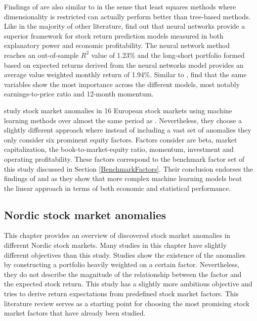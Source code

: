 \documentclass[12pt]{article}
\begin{document}

Findings of \citet{Drobetz} are also similar to \citet{TOBEK2021100588} in the sense that least squares methods where dimensionality is restricted can actually perform better than tree-based methods. Like in the majority of other literature, \citeauthor{Drobetz} find out that neural networks provide a superior framework for stock return prediction models measured in both explanatory power and economic profitability. The neural network method reaches an out-of-sample $R^{2}$ value of 1.23\% and the long-short portfolio formed based on expected returns derived from the neural networks model provides an average value weighted monthly return of 1.94\%. Similar to \citet{guetal}, \citeauthor{Drobetz} find that the same variables show the most importance across the different models, most notably earnings-to-price ratio and 12-month momentum. \par

\citet*{Fieberg} study stock market anomalies in 16 European stock markets using machine learning methods over almost the same period as \citet{Drobetz}\footnotemark. Nevertheless, they choose a slightly different approach where instead of including a vast set of anomalies they only consider six prominent equity factors. Factors \citeauthor{Fieberg} consider are beta, market capitalization, the book-to-market-equity ratio, momentum, investment and operating profitability. These factors correspond to the benchmark factor set of this study discussed in Section \ref{BenchmarkFactors}. Their conclusion endorses the findings of \citet{Drobetz} and \citet{TOBEK2021100588} as they show that more complex machine learning models beat the linear approach in terms of both economic and statistical performance. \par


\subsection{Nordic stock market anomalies}\label{NordicStockMarketAnomalies}

This chapter provides an overview of discovered stock market anomalies in different Nordic stock markets. Many studies in this chapter have slightly different objectives than this study. Studies show the existence of the anomalies by constructing a portfolio heavily weighted on a certain factor. Nevertheless, they do not describe the magnitude of the relationship between the factor and the expected stock return. This study has a slightly more ambitious objective and tries to derive return expectations from predefined stock market factors. This literature review serves as a starting point for choosing the most promising stock market factors that have already been studied. \par
\end{document}
